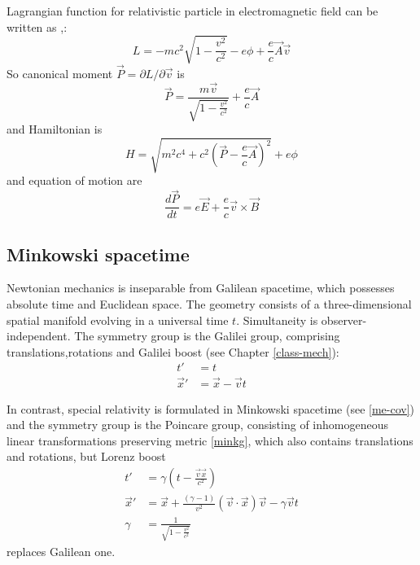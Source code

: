  Lagrangian function for relativistic
particle in electromagnetic field can be written as
\cite{Landau-Lifshitz-2},\cite{Goldstein}:
\begin{equation}
   \label {lagr-3d}
   L=-m c^2 \sqrt{1-\frac{v^2}{c^2}} - e \phi + \frac{e}{c} \vec A \vec v
\end{equation}
So canonical moment $ \vec P = \partial L/\partial \vec v $ is
\begin{equation}
   \label {mon-3d}
    \vec P=\frac{m \vec v}{\sqrt{1-\frac{v^2}{c^2}}} +\frac{e}{c} \vec A 
\end{equation}
and Hamiltonian is
\begin{equation}
   \label {ham-3d}
    H=\sqrt{m^2 c^4+c^2 (\vec P -\frac{e}{c} \vec A)^2} +e \phi
\end{equation}
and equation of motion are
\begin{equation}
   \label {eqm-3d}
   \frac{d \vec P}{d t}=e \vec E + \frac{e}{c} \vec v \times \vec B
\end{equation}

\subsection{Minkowski spacetime}
\label {minkowski-spacetime}
Newtonian mechanics is inseparable from Galilean spacetime,
which possesses
absolute time and Euclidean space. The geometry consists of a 
three-dimensional spatial manifold evolving in a universal time $t$.
Simultaneity is observer-independent. The symmetry group is 
the Galilei group, comprising translations,rotations and Galilei boost
(see Chapter \ref{class-mech}):
\begin{equation}
   \label {gal-boost}
   \begin{split}
       t' &= t \\
       \vec x' &= \vec x -\vec v t
   \end{split}
\end{equation}

In contrast, special relativity is formulated in Minkowski spacetime (see \ref{me-cov})
 and the symmetry group is the Poincare group, consisting of
 inhomogeneous linear transformations preserving metric \eqref{minkg}, which also
 contains translations and rotations, but Lorenz boost
 \begin{equation}
    \label {lor-boost}
    \begin{split}
        t' &= \gamma (t-\frac{\vec v \vec x}{c^2}) \\
        \vec x' &= \vec x + \frac{(\gamma -1)}{v^2} (\vec v \cdot \vec x) \vec v-\gamma \vec v t  \\
        \gamma &= \frac{1}{\sqrt{1-\frac{v^2}{c^2}}}
    \end{split}
 \end{equation}
 replaces Galilean one.

